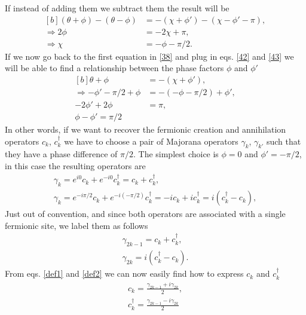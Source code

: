 If instead of adding them we subtract them the result will be 
\begin{equation}
    \begin{aligned}[b]
        (\theta+\phi) - (\theta-\phi)&= - (\chi+\phi') - (\chi-\phi'-\pi),\\
        \Rightarrow 2\phi &= -2\chi + \pi,\\
        \Rightarrow \chi &= -\phi - \pi/2.
    \end{aligned}
    \label{43}
\end{equation}
If we now go back to the first equation in \ref{38} and plug in eqs. \ref{42} and \ref{43} we will be able to find a relationship between the phase factors $\phi$ and $\phi'$
\begin{equation}
    \begin{aligned}[b]
        \theta+\phi &= - (\chi+\phi'),\\
        \Rightarrow -\phi' - \pi/2 +\phi &= -(-\phi - \pi/2)+\phi',\\
        -2\phi' +2\phi &= \pi,\\
        \phi - \phi' = \pi/2
    \end{aligned}
\end{equation}
In other words, if we want to recover the fermionic creation and annihilation operators $c_k$, $c_k^\dagger$ we have to choose a pair of Majorana operators $\gamma_k$, $\gamma_{k'}$ such that they have a phase difference of $\pi/2$. The simplest choice is $\phi=0$ and $\phi'=-\pi/2$, in this case the resulting operators are 
\begin{eqnarray}
    \gamma_k = e^{i0}c_k + e^{-i0}c_k^\dagger = c_k + c_k^\dagger,\nonumber \\
    \gamma_k = e^{-i\pi/2}c_k + e^{-i(-\pi/2)}c_k^\dagger = -ic_k +i c_k^\dagger = i(c_k^\dagger - c_k)\nonumber,
\end{eqnarray}
Just out of convention, and since both operators are associated with a single fermionic site, we label them as follows
\begin{eqnarray}
    \gamma_{2k-1} = c_k + c_k^\dagger,\label{def1}\\
    \gamma_{2k} = i(c_k^\dagger - c_k)\label{def2}.
\end{eqnarray}
From eqs. \ref{def1} and \ref{def2} we can now easily find how to express $c_k$ and $c_k^\dagger$
\begin{eqnarray}
    c_k = \frac{\gamma_{2k-1} + i \gamma_{2k}}{2},\label{cMaj}\\
    c_k^\dagger = \frac{\gamma_{2k-1} - i \gamma_{2k}}{2} \label{cMaj2}
\end{eqnarray}
